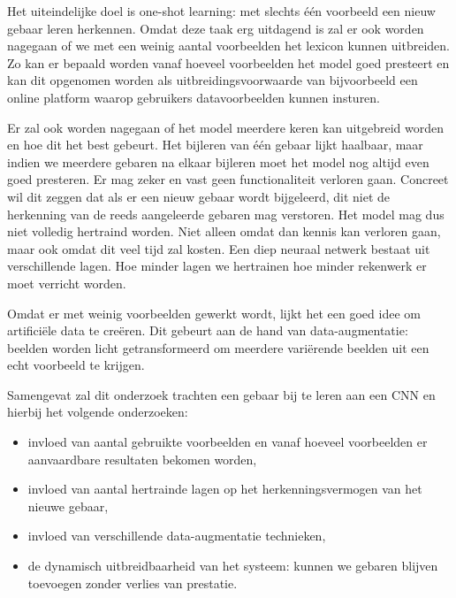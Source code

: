 \npar  Het uiteindelijke doel is one-shot learning: met slechts \'e\'en voorbeeld een nieuw gebaar leren herkennen.  Omdat deze taak erg uitdagend is zal er ook worden nagegaan of we met een weinig aantal voorbeelden het lexicon kunnen uitbreiden. Zo kan er bepaald worden vanaf hoeveel voorbeelden het model goed presteert en kan dit opgenomen worden als uitbreidingsvoorwaarde van bijvoorbeeld een online platform waarop gebruikers datavoorbeelden kunnen insturen.

\npar Er zal ook worden nagegaan of het model meerdere keren kan uitgebreid worden en hoe dit het best gebeurt. Het bijleren van \'e\'en gebaar lijkt haalbaar, maar indien we meerdere gebaren na elkaar bijleren moet het model nog altijd even goed presteren. Er mag zeker en vast geen functionaliteit verloren gaan. Concreet wil dit zeggen dat als er een nieuw gebaar wordt bijgeleerd, dit niet de herkenning van de reeds aangeleerde gebaren mag verstoren. Het model mag dus niet volledig hertraind worden. Niet alleen omdat dan kennis kan verloren gaan, maar ook omdat dit veel tijd zal kosten. Een diep neuraal netwerk bestaat uit verschillende lagen. Hoe minder lagen we hertrainen hoe minder rekenwerk er moet verricht worden.

\npar Omdat er met weinig voorbeelden gewerkt wordt, lijkt het een goed idee om artifici\"ele data te cre\"eren. Dit gebeurt aan de hand van data-augmentatie: beelden worden licht getransformeerd om meerdere vari\"erende beelden uit een echt voorbeeld te krijgen.

\npar Samengevat zal dit onderzoek trachten een gebaar bij te leren aan een CNN en hierbij het volgende onderzoeken:
\begin{itemize}
	\item invloed van aantal gebruikte voorbeelden en vanaf hoeveel voorbeelden er aanvaardbare resultaten bekomen worden,
	\item invloed van aantal hertrainde lagen op het herkenningsvermogen van het nieuwe gebaar,
	\item invloed van verschillende data-augmentatie technieken,
	\item de dynamisch uitbreidbaarheid van het systeem: kunnen we gebaren blijven toevoegen zonder verlies van prestatie.
\end{itemize}






 